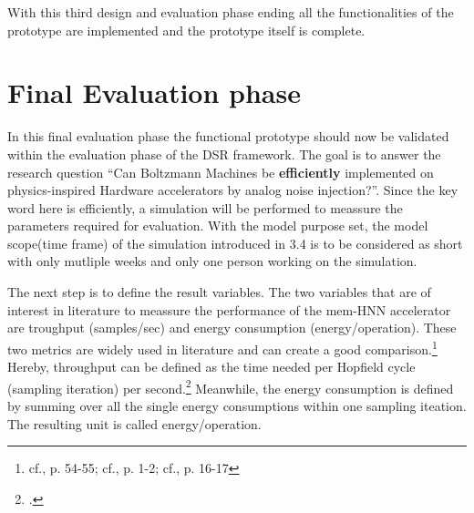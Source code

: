 With this third design and evaluation phase ending all the functionalities of the prototype are implemented and the prototype itself is complete. 

\section{Final Evaluation phase}
In this final evaluation phase the functional prototype should now be validated within the evaluation phase of the \ac{DSR} framework.
The goal is to answer the research question ``Can Boltzmann Machines be \textbf{efficiently} implemented on physics-inspired
Hardware accelerators by analog noise injection?''.
Since the key word here is efficiently, a simulation will be performed to meassure the parameters required for evaluation.
With the model purpose set, the model scope(time frame) of the simulation introduced in 3.4 is to be considered as short with only mutliple weeks and only one person working on the simulation. 

The next step is to define the result variables. The two variables that are of interest in literature to meassure the performance of the
\ac{mem-HNN} accelerator are troughput (samples/sec) and energy consumption (energy/operation). 
These two metrics are widely used in literature and can create a good comparison.\footnote{cf.\cite{bellettiJanusFPGABasedSystem2009}, p. 54-55; cf.\cite{aaditAcceleratingAdaptiveParallel2023}, p. 1-2; cf.\cite{ortega-zamoranoFPGAHardwareAcceleration2016}, p. 16-17}
Hereby, throughput can be defined as the time needed per Hopfield cycle (sampling iteration) per second.\footcite[cf.][6-7]{bohmNoiseinjectedAnalogIsing2022} 
Meanwhile, the energy consumption is defined by summing over all the single energy consumptions within one sampling iteation.
The resulting unit is called energy/operation. 

